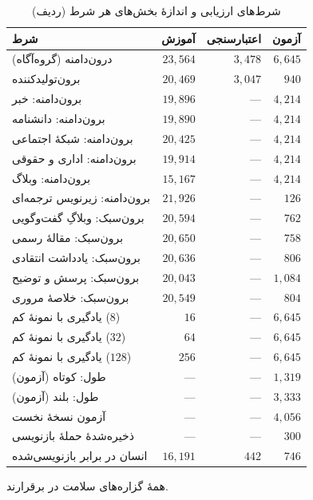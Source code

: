\begin{table}[H]
\centering
\caption{شرط‌های ارزیابی و اندازهٔ بخش‌های هر شرط (ردیف)}
\label{tab:v2-splits}
\begin{tabular}{lrrr}
\toprule
\textbf{شرط} & \textbf{آموزش} & \textbf{اعتبارسنجی} & \textbf{آزمون} \\
\midrule
درون‌دامنه (گروه‌آگاه) & $23{,}564$ & $3{,}478$ & $6{,}645$ \\
برون‌تولیدکننده & $20{,}469$ & $3{,}047$ & $940$ \\
برون‌دامنه: خبر & $19{,}896$ & — & $4{,}214$ \\
برون‌دامنه: دانشنامه & $19{,}890$ & — & $4{,}214$ \\
برون‌دامنه: شبکهٔ اجتماعی & $20{,}425$ & — & $4{,}214$ \\
برون‌دامنه: اداری و حقوقی & $19{,}914$ & — & $4{,}214$ \\
برون‌دامنه: وبلاگ & $15{,}167$ & — & $4{,}214$ \\
برون‌دامنه: زیرنویس ترجمه‌ای & $21{,}926$ & — & $126$ \\
برون‌سبک: وبلاگِ گفت‌وگویی & $20{,}594$ & — & $762$ \\
برون‌سبک: مقالهٔ رسمی & $20{,}650$ & — & $758$ \\
برون‌سبک: یادداشت انتقادی & $20{,}636$ & — & $806$ \\
برون‌سبک: پرسش و توضیح & $20{,}043$ & — & $1{,}084$ \\
برون‌سبک: خلاصهٔ مروری & $20{,}549$ & — & $804$ \\
یادگیری با نمونهٔ کم ($8$) & $16$ & — & $6{,}645$ \\
یادگیری با نمونهٔ کم ($32$) & $64$ & — & $6{,}645$ \\
یادگیری با نمونهٔ کم ($128$) & $256$ & — & $6{,}645$ \\
طول: کوتاه (آزمون) & — & — & $1{,}319$ \\
طول: بلند (آزمون) & — & — & $3{,}333$ \\
آزمون نسخهٔ نخست & — & — & $4{,}056$ \\
ذخیره‌شدهٔ حملهٔ بازنویسی & — & — & $300$ \\
انسان در برابر بازنویسی‌شده & $16{,}191$ & $442$ & $746$ \\
\bottomrule
\end{tabular}
\end{table}

همهٔ گزاره‌های سلامت در \texttt{} برقرارند.
